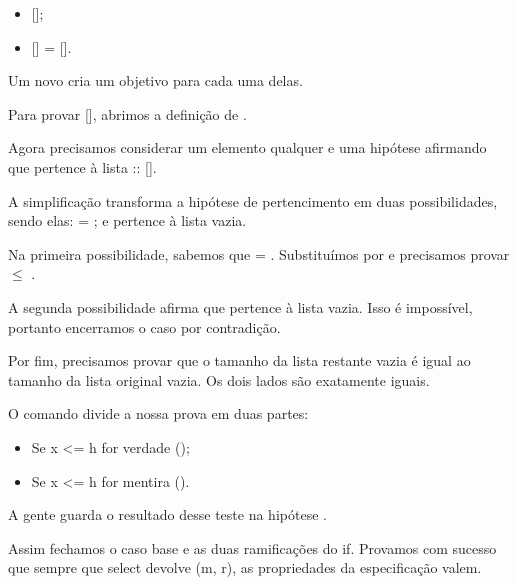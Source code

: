 \begin{itemize}
\item  {}  [];

\item  {} [] =  [].

\end{itemize}
          Um novo  cria um objetivo para cada uma delas. 
\begin{coqdoccode}
\end{coqdoccode}
Para provar   [], abrimos a definição de . 
\begin{coqdoccode}
\end{coqdoccode}
Agora precisamos considerar um elemento qualquer  e uma hipótese  afirmando que  pertence à lista  :: []. 
\begin{coqdoccode}
\end{coqdoccode}
A simplificação transforma a hipótese de pertencimento em duas possibilidades, sendo elas:  = ; e  pertence à lista vazia. 
\begin{coqdoccode}
\end{coqdoccode}
Na primeira possibilidade, sabemos que  = . Substituímos  por  e precisamos provar  \ensuremath{\le} . 
\begin{coqdoccode}
\end{coqdoccode}
A segunda possibilidade afirma que  pertence à lista vazia. Isso é impossível, portanto encerramos o caso por contradição. 
\begin{coqdoccode}
\end{coqdoccode}
Por fim, precisamos provar que o tamanho da lista restante vazia é igual ao tamanho da lista original vazia. Os dois lados são exatamente iguais. 
\begin{coqdoccode}
\end{coqdoccode}
O comando  divide a nossa prova em duas partes:

\begin{itemize}
\item  Se x <= h for verdade ();

\item  Se x <= h for mentira ().

\end{itemize}
        A gente guarda o resultado desse teste na hipótese . 
\begin{coqdoccode}
\end{coqdoccode}
Assim fechamos o caso base e as duas ramificações do if.
    Provamos com sucesso que sempre que select devolve (m, r), as propriedades da especificação valem. 
\begin{coqdoccode}
\coqdocemptyline
\end{coqdoccode}
